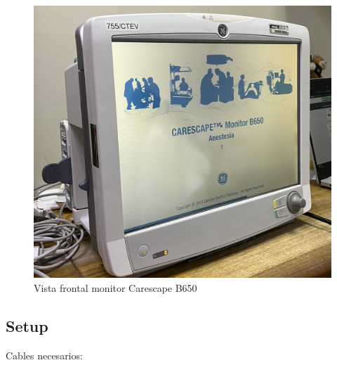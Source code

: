 \documentclass{article}
\begin{document}
\begin{figure}[h]
	\centering
    \includegraphics[scale=0.6]{img/carescape_b650.jpeg}
    \caption{Vista frontal monitor Carescape B650}
    \label{fig:b650_frontal}
\end{figure}

\subsection{Setup}
Cables necesarios:
\end{document}
